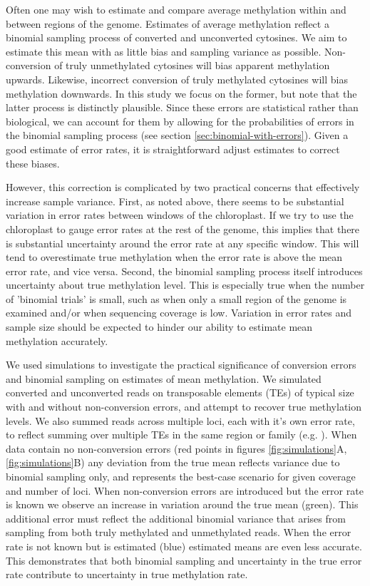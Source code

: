 \documentclass[twocolumn,twoside,lettersize]{article}
\begin{document}
Often one may wish to estimate and compare average methylation within and between regions of the genome.
Estimates of average methylation reflect a binomial sampling process of converted and unconverted cytosines.
We aim to estimate this mean with as little bias and sampling variance as possible.
Non-conversion of truly unmethylated cytosines will bias apparent methylation upwards.
Likewise, incorrect conversion of truly methylated cytosines will bias methylation downwards.
In this study we focus on the former, but note that the latter process is distinctly plausible.
Since these errors are statistical rather than biological, we can account for them by allowing for the probabilities of errors in the binomial sampling process (see section \ref{sec:binomial-with-errors}).
Given a good estimate of error rates, it is straightforward adjust estimates to correct these biases.

However, this correction is complicated by two practical concerns that effectively increase sample variance.
First, as noted above, there seems to be substantial variation in error rates between windows of the chloroplast.
If we try to use the chloroplast to gauge error rates at the rest of the genome, this implies that there is substantial uncertainty around the error rate at any specific window.
This will tend to overestimate true methylation when the error rate is above the mean error rate, and vice versa.
Second, the binomial sampling process itself introduces uncertainty about true methylation level.
This is especially true when the number of 'binomial trials' is small, such as when only a small region of the genome is examined and/or when sequencing coverage is low.
Variation in error rates and sample size should be expected to hinder our ability to estimate mean methylation accurately.

We used simulations to investigate the practical significance of conversion errors and binomial sampling on estimates of mean methylation.
We simulated converted and unconverted reads on transposable elements (TEs) of typical size with and without non-conversion errors, and attempt to recover true methylation levels.
We also summed reads across multiple loci, each with it's own error rate, to reflect summing over multiple TEs in the same region or family (e.g. \cite{sasaki2019common}).
When data contain no non-conversion errors (red points in figures \ref{fig:simulations}A, \ref{fig:simulations}B) any deviation from the true mean reflects variance due to binomial sampling only, and represents the best-case scenario for given coverage and number of loci.
When non-conversion errors are introduced but the error rate is known we observe an increase in variation around the true mean (green).
This additional error must reflect the additional binomial variance that arises from sampling from both truly methylated and unmethylated reads.
When the error rate is not known but is estimated (blue) estimated means are even less accurate.
This demonstrates that both binomial sampling and uncertainty in the true error rate contribute to uncertainty in true methylation rate.
\end{document}
